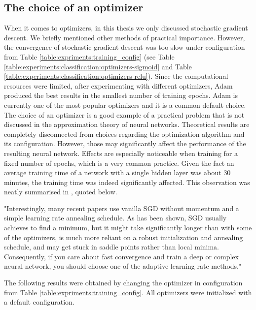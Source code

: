 
\pagebreak
\subsection{The choice of an optimizer}
\label{subsection:experiments:classification:optimizer}
When it comes to optimizers, in this thesis we only discussed stochastic gradient descent. We briefly mentioned other methods of practical importance. However, the convergence of stochastic gradient descent was too slow under configuration from Table \ref{table:expriments:training_config} (see Table \ref{table:experiments:classification:optimizers-sigmoid} and Table \ref{table:experiments:classification:optimizers-relu}). 
Since the computational resources were limited, after experimenting with different optimizers, Adam produced the best results in the smallest number of training epochs. Adam is currently one of the most popular optimizers and it is a common default choice. The choice of an optimizer is a good example of a practical problem that is not discussed in the approximation theory of neural networks. Theoretical results are completely disconnected from choices regarding the optimization algorithm and its configuration. However, those may significantly affect the performance of the resulting neural network. Effects are especially noticeable when training for a fixed number of epochs, which is a very common practice. Given the fact an average training time of a network with a single hidden layer was about 30 minutes, the training time was indeed significantly affected. This observation was neatly summarised in  \cite{ruder_2017_an}, quoted below.

\begin{displayquote}
"Interestingly, many recent papers use vanilla SGD without momentum and a simple learning rate
annealing schedule. As has been shown, SGD usually achieves to find a minimum, but it might take
significantly longer than with some of the optimizers, is much more reliant on a robust initialization
and annealing schedule, and may get stuck in saddle points rather than local minima. Consequently,
if you care about fast convergence and train a deep or complex neural network, you should choose
one of the adaptive learning rate methods."
\end{displayquote}

The following results were obtained by changing the optimizer in configuration from Table \ref{table:expriments:training_config}. All optimizers were initialized with a default configuration.


